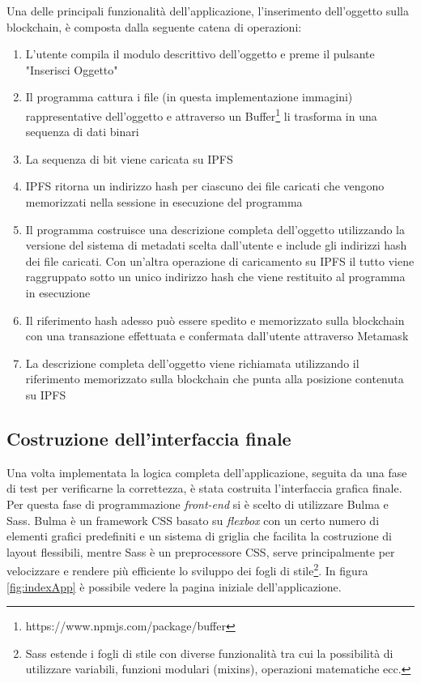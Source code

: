 Una delle principali funzionalità dell'applicazione, l'inserimento dell'oggetto sulla blockchain, è composta dalla seguente catena di operazioni:

\begin{enumerate}
    \item L'utente compila il modulo descrittivo dell'oggetto e preme il pulsante "Inserisci Oggetto"
    \item Il programma cattura i file (in questa implementazione immagini) rappresentative dell'oggetto e attraverso un Buffer\footnote{https://www.npmjs.com/package/buffer} li trasforma in una sequenza di dati binari
    \item La sequenza di bit viene caricata su IPFS
    \item IPFS ritorna un indirizzo hash per ciascuno dei file caricati che vengono memorizzati nella sessione in esecuzione del programma
    \item Il programma costruisce una descrizione completa dell'oggetto utilizzando la versione del sistema di metadati scelta dall'utente e include gli indirizzi hash dei file caricati. Con un’altra operazione di caricamento su IPFS il tutto viene raggruppato sotto un unico indirizzo hash che viene restituito al programma in esecuzione
    \item Il riferimento hash adesso può essere spedito e memorizzato sulla blockchain con una transazione effettuata e confermata dall'utente attraverso Metamask
    \item La descrizione completa dell'oggetto viene richiamata utilizzando il riferimento memorizzato sulla blockchain che punta alla posizione contenuta su IPFS
\end{enumerate}


\subsection{Costruzione dell'interfaccia finale}

Una volta implementata la logica completa dell’applicazione, seguita da una fase di test per verificarne la correttezza, è stata costruita l’interfaccia grafica finale. Per questa fase di programmazione \emph{front-end} si è scelto di utilizzare Bulma e Sass. Bulma è un framework CSS basato su \emph{flexbox} con un certo numero di elementi grafici predefiniti e un sistema di griglia che facilita la costruzione di layout flessibili, mentre Sass è un preprocessore CSS, serve principalmente per velocizzare e rendere più efficiente lo sviluppo dei fogli di stile\footnote{Sass estende i fogli di stile con diverse funzionalità tra cui la possibilità di utilizzare variabili, funzioni modulari (mixins), operazioni matematiche ecc.}. In figura \ref{fig:indexApp} è possibile vedere la pagina iniziale dell'applicazione.

